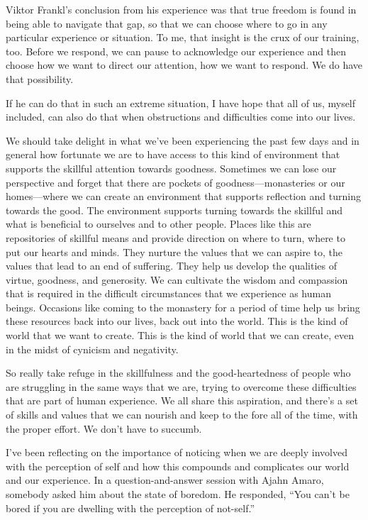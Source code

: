 Viktor Frankl's conclusion from his experience was that true freedom is found in being able to navigate that gap, so that we can choose where to go in any particular experience or situation. To me, that insight is the crux of our training, too. Before we respond, we can pause to acknowledge our experience and then choose how we want to direct our attention, how we want to respond. We do have that possibility.

If he can do that in such an extreme situation, I have hope that all of us, myself included, can also do that when obstructions and difficulties come into our lives.

We should take delight in what we've been experiencing the past few days and in general how fortunate we are to have access to this kind of environment that supports the skillful attention towards goodness. Sometimes we can lose our perspective and forget that there are pockets of goodness---monasteries or our homes---where we can create an environment that supports reflection and turning towards the good. The environment supports turning towards the skillful and what is beneficial to ourselves and to other people. Places like this are repositories of skillful means and provide direction on where to turn, where to put our hearts and minds. They nurture the values that we can aspire to, the values that lead to an end of suffering. They help us develop the qualities of virtue, goodness, and generosity. We can cultivate the wisdom and compassion that is required in the difficult circumstances that we experience as human beings. Occasions like coming to the monastery for a period of time help us bring these resources back into our lives, back out into the world. This is the kind of world that we want to create. This is the kind of world that we can create, even in the midst of cynicism and negativity.

So really take refuge in the skillfulness and the good-heartedness of people who are struggling in the same ways that we are, trying to overcome these difficulties that are part of human experience. We all share this aspiration, and there's a set of skills and values that we can nourish and keep to the fore all of the time, with the proper effort. We don't have to succumb.

I've been reflecting on the importance of noticing when we are deeply involved with the perception of self and how this compounds and complicates our world and our experience. In a question-and-answer session with Ajahn Amaro, somebody asked him about the state of boredom. He responded, ``You can't be bored if you are dwelling with the perception of not-self.''

